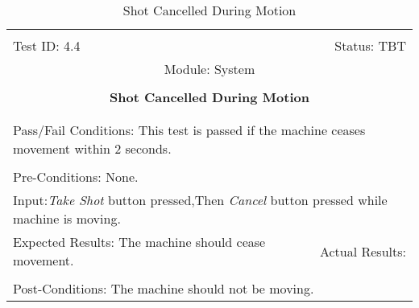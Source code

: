 \documentclass[titlepage]{article}
\begin{document}
\begin{center}%
\begin{table}
\begin{tabular}{|l r|}\hline&\\[-2mm]
	Test ID: 4.4	&Status: TBT\\[-3mm]
	\multicolumn{2}{|c|}{Module: System}\\&\\
	\multicolumn{2}{|c|}{\textbf{\large{Shot Cancelled During Motion}}}\\&\\\hline&\\[-3mm]
	\multicolumn{2}{|p{\textwidth}|}{Pass/Fail Conditions: This test is passed if the machine ceases movement within 2 seconds.}\\[1mm]\hline&\\[-3mm]
	\multicolumn{2}{|p{\textwidth}|}{Pre-Conditions: None.}\\[4mm]
	\multicolumn{2}{|p{\textwidth}|}{Input:\newline\textit{Take Shot} button pressed,\newline Then \textit{Cancel} button pressed while machine is moving.}\\[2mm]\hline
	\multicolumn{1}{|p{0.49\textwidth}}{Expected Results: The machine should cease movement.}	&\multicolumn{1}{|p{0.45\textwidth}|}{Actual Results: }\\\hline&\\[-3mm]
	\multicolumn{2}{|p{\textwidth}|}{Post-Conditions: The machine should not be moving.}\\\hline
\end{tabular}
\caption{Shot Cancelled During Motion}
\end{table}
\end{center}
\end{document}
